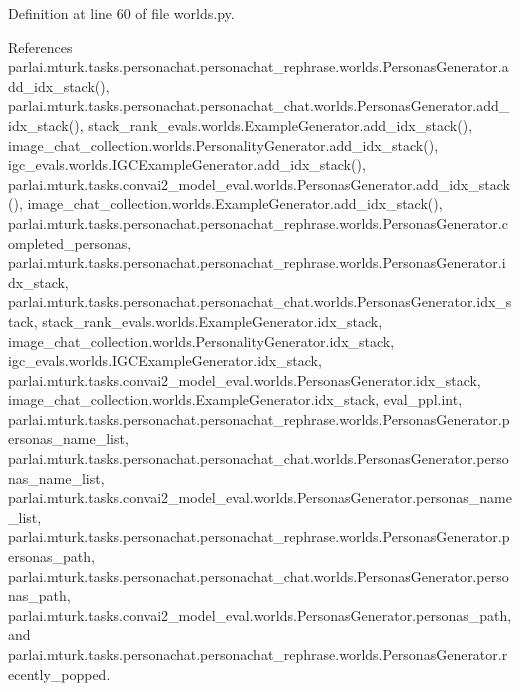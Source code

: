 Definition at line 60 of file worlds.\+py.



References parlai.\+mturk.\+tasks.\+personachat.\+personachat\+\_\+rephrase.\+worlds.\+Personas\+Generator.\+add\+\_\+idx\+\_\+stack(), parlai.\+mturk.\+tasks.\+personachat.\+personachat\+\_\+chat.\+worlds.\+Personas\+Generator.\+add\+\_\+idx\+\_\+stack(), stack\+\_\+rank\+\_\+evals.\+worlds.\+Example\+Generator.\+add\+\_\+idx\+\_\+stack(), image\+\_\+chat\+\_\+collection.\+worlds.\+Personality\+Generator.\+add\+\_\+idx\+\_\+stack(), igc\+\_\+evals.\+worlds.\+I\+G\+C\+Example\+Generator.\+add\+\_\+idx\+\_\+stack(), parlai.\+mturk.\+tasks.\+convai2\+\_\+model\+\_\+eval.\+worlds.\+Personas\+Generator.\+add\+\_\+idx\+\_\+stack(), image\+\_\+chat\+\_\+collection.\+worlds.\+Example\+Generator.\+add\+\_\+idx\+\_\+stack(), parlai.\+mturk.\+tasks.\+personachat.\+personachat\+\_\+rephrase.\+worlds.\+Personas\+Generator.\+completed\+\_\+personas, parlai.\+mturk.\+tasks.\+personachat.\+personachat\+\_\+rephrase.\+worlds.\+Personas\+Generator.\+idx\+\_\+stack, parlai.\+mturk.\+tasks.\+personachat.\+personachat\+\_\+chat.\+worlds.\+Personas\+Generator.\+idx\+\_\+stack, stack\+\_\+rank\+\_\+evals.\+worlds.\+Example\+Generator.\+idx\+\_\+stack, image\+\_\+chat\+\_\+collection.\+worlds.\+Personality\+Generator.\+idx\+\_\+stack, igc\+\_\+evals.\+worlds.\+I\+G\+C\+Example\+Generator.\+idx\+\_\+stack, parlai.\+mturk.\+tasks.\+convai2\+\_\+model\+\_\+eval.\+worlds.\+Personas\+Generator.\+idx\+\_\+stack, image\+\_\+chat\+\_\+collection.\+worlds.\+Example\+Generator.\+idx\+\_\+stack, eval\+\_\+ppl.\+int, parlai.\+mturk.\+tasks.\+personachat.\+personachat\+\_\+rephrase.\+worlds.\+Personas\+Generator.\+personas\+\_\+name\+\_\+list, parlai.\+mturk.\+tasks.\+personachat.\+personachat\+\_\+chat.\+worlds.\+Personas\+Generator.\+personas\+\_\+name\+\_\+list, parlai.\+mturk.\+tasks.\+convai2\+\_\+model\+\_\+eval.\+worlds.\+Personas\+Generator.\+personas\+\_\+name\+\_\+list, parlai.\+mturk.\+tasks.\+personachat.\+personachat\+\_\+rephrase.\+worlds.\+Personas\+Generator.\+personas\+\_\+path, parlai.\+mturk.\+tasks.\+personachat.\+personachat\+\_\+chat.\+worlds.\+Personas\+Generator.\+personas\+\_\+path, parlai.\+mturk.\+tasks.\+convai2\+\_\+model\+\_\+eval.\+worlds.\+Personas\+Generator.\+personas\+\_\+path, and parlai.\+mturk.\+tasks.\+personachat.\+personachat\+\_\+rephrase.\+worlds.\+Personas\+Generator.\+recently\+\_\+popped.

